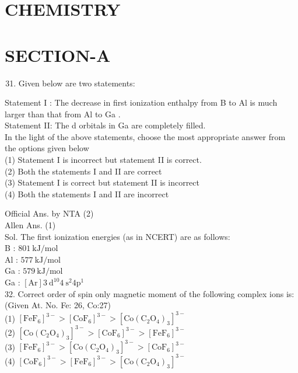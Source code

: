 \documentclass[10pt]{article}
\begin{document}
\section*{CHEMISTRY}
\section*{SECTION-A}
\begin{enumerate}
  \setcounter{enumi}{30}
  \item Given below are two statements:
\end{enumerate}

Statement I : The decrease in first ionization enthalpy from B to Al is much larger than that from Al to Ga .\\
Statement II: The d orbitals in Ga are completely filled.\\
In the light of the above statements, choose the most appropriate answer from the options given below\\
(1) Statement I is incorrect but statement II is correct.\\
(2) Both the statements I and II are correct\\
(3) Statement I is correct but statement II is incorrect\\
(4) Both the statements I and II are incorrect

Official Ans. by NTA (2)\\
Allen Ans. (1)\\
Sol. The first ionization energies (as in NCERT) are as follows:\\
B : \(801 \mathrm{~kJ} / \mathrm{mol}\)\\
Al : \(577 \mathrm{~kJ} / \mathrm{mol}\)\\
Ga : \(579 \mathrm{~kJ} / \mathrm{mol}\)\\
Ga : \([\mathrm{Ar}] 3 \mathrm{~d}^{10} 4 \mathrm{~s}^{2} 4 \mathrm{p}^{1}\)\\
32. Correct order of spin only magnetic moment of the following complex ions is:\\
(Given At. No. Fe: 26, Co:27)\\
(1) \(\left[\mathrm{FeF}_{6}\right]^{3-}>\left[\mathrm{CoF}_{6}\right]^{3-}>\left[\mathrm{Co}\left(\mathrm{C}_{2} \mathrm{O}_{4}\right)_{3}\right]^{3-}\)\\
(2) \(\left[\mathrm{Co}\left(\mathrm{C}_{2} \mathrm{O}_{4}\right)_{3}\right]^{3-}>\left[\mathrm{CoF}_{6}\right]^{3-}>\left[\mathrm{FeF}_{6}\right]^{3-}\)\\
(3) \(\left[\mathrm{FeF}_{6}\right]^{3-}>\left[\mathrm{Co}\left(\mathrm{C}_{2} \mathrm{O}_{4}\right)_{3}\right]^{3-}>\left[\mathrm{CoF}_{6}\right]^{3-}\)\\
(4) \(\left[\mathrm{CoF}_{6}\right]^{3-}>\left[\mathrm{FeF}_{6}\right]^{3-}>\left[\mathrm{Co}\left(\mathrm{C}_{2} \mathrm{O}_{4}\right)_{3}\right]^{3-}\)
\end{document}

